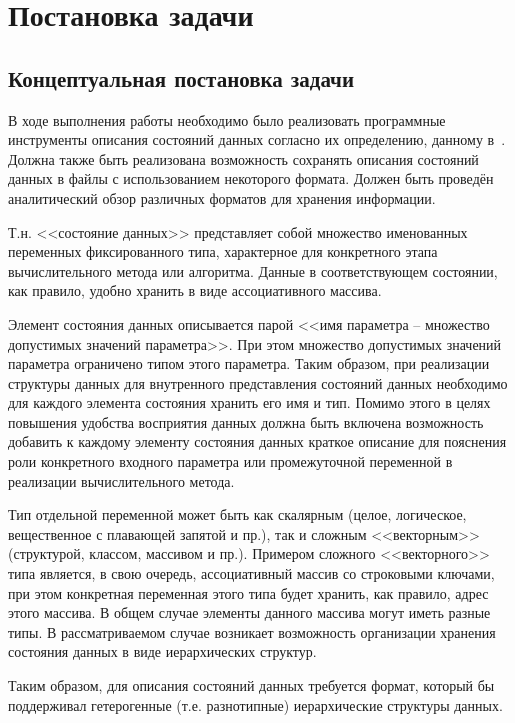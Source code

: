 \chapter{Постановка задачи}
\section{Концептуальная постановка задачи}

В ходе выполнения работы необходимо было реализовать программные инструменты описания состояний данных согласно их определению, данному в~\cite{SokolovPershin2018}. Должна также быть реализована возможность сохранять описания состояний данных в файлы с использованием некоторого формата. Должен быть проведён аналитический обзор различных форматов для хранения информации.

Т.н. <<состояние данных>>\cite{SokolovPershin2018} представляет собой множество именованных переменных фиксированного типа, характерное для конкретного этапа вычислительного метода или алгоритма. Данные в соответствующем состоянии, как правило, удобно хранить в виде ассоциативного массива.



Элемент состояния данных описывается парой <<имя параметра -- множество допустимых значений параметра>>\cite{SokolovPershin2018}. При этом множество допустимых значений параметра ограничено типом этого параметра. Таким образом, при реализации структуры данных для внутренного представления состояний данных необходимо для каждого элемента состояния хранить его имя и тип. Помимо этого в целях повышения удобства восприятия данных должна быть включена возможность добавить к каждому элементу состояния данных краткое описание для пояснения роли конкретного входного параметра или промежуточной переменной в реализации вычислительного метода.

Тип отдельной переменной может быть как скалярным (целое, логическое, вещественное с плавающей запятой и пр.), так и сложным <<векторным>> (структурой, классом, массивом и пр.). Примером сложного <<векторного>> типа является, в свою очередь, ассоциативный массив со строковыми ключами, при этом конкретная переменная этого типа будет хранить, как правило, адрес этого массива. В общем случае элементы данного массива могут иметь разные типы. В рассматриваемом случае возникает возможность организации хранения состояния данных в виде иерархических структур.

Таким образом, для описания состояний данных требуется формат, который бы поддерживал гетерогенные (т.е. разнотипные) иерархические структуры данных.


